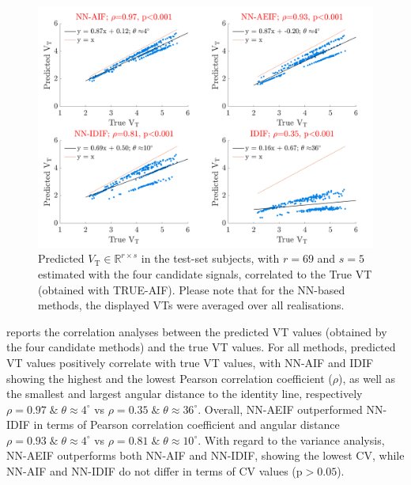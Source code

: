         \begin{figure}
            \centering
            
            \includegraphics[width=1.0\linewidth]{figures/arterial_input_function_correlation.png}
            
            \captionsetup{singlelinecheck=false, justification=centering}
            \caption{
                Predicted $V_{\mathrm{T}} \in \mathbb{R}^{r \times s}$ in the test-set subjects, with $r = 69$ and $s=5$ estimated with the four candidate signals, correlated to the True \gls{VT} (obtained with TRUE-\gls{AIF}). Please note that for the \gls{NN}-based methods, the displayed \glspl{VT} were averaged over all realisations.
            }
            \label{fig:a_bayesian_neural_network-based_method_for_the_extraction_of_a_metabolite_corrected_arterial_input_function_from_dynamic_pbr28_pet_appendix_results_correlation}
       \end{figure}
    
        
        reports the correlation analyses between the predicted \gls{VT} values (obtained by the four candidate methods) and the true \gls{VT} values. For all methods, predicted \gls{VT} values positively correlate with true \gls{VT} values, with \gls{NN}-\gls{AIF} and \gls{IDIF} showing the highest and the lowest Pearson correlation coefficient ($\rho$), as well as the smallest and largest angular distance to the identity line, respectively $\rho = 0.97 \; \& \;  \theta \approx 4^{\circ}$ vs $\rho = 0.35 \; \&  \; \theta \approx 36^{\circ}$. Overall, \gls{NN}-\gls{AE}\gls{IF} outperformed \gls{NN}-\gls{IDIF} in terms of Pearson correlation coefficient and angular distance $\rho = 0.93 \; \& \; \theta  \approx 4^{\circ}$ vs $\rho = 0.81 \; \&  \; \theta \approx 10^{\circ}$. With regard to the variance analysis, \gls{NN}-\gls{AE}\gls{IF} outperforms both \gls{NN}-\gls{AIF} and \gls{NN}-\gls{IDIF}, showing the lowest \gls{CV}, while \gls{NN}-\gls{AIF} and \gls{NN}-\gls{IDIF} do not differ in terms of \gls{CV} values (p$>0.05$).
    
